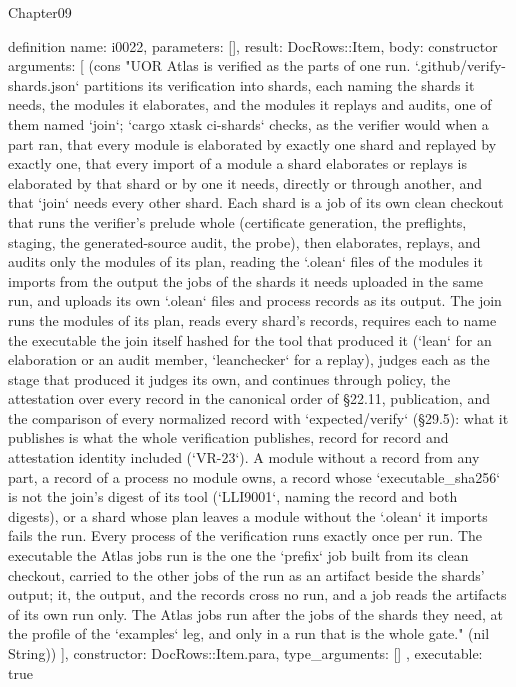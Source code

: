 \begin{lexlean}{Chapter09}
\begin{semanticmodule}
definition{
  name: i0022,
  parameters: [],
  result: DocRows::Item,
  body: constructor{
    arguments: [
      (cons "UOR Atlas is verified as the parts of one run. `.github/verify-shards.json` partitions its verification into shards, each naming the shards it needs, the modules it elaborates, and the modules it replays and audits, one of them named `join`; `cargo xtask ci-shards` checks, as the verifier would when a part ran, that every module is elaborated by exactly one shard and replayed by exactly one, that every import of a module a shard elaborates or replays is elaborated by that shard or by one it needs, directly or through another, and that `join` needs every other shard. Each shard is a job of its own clean checkout that runs the verifier's prelude whole (certificate generation, the preflights, staging, the generated-source audit, the probe), then elaborates, replays, and audits only the modules of its plan, reading the `.olean` files of the modules it imports from the output the jobs of the shards it needs uploaded in the same run, and uploads its own `.olean` files and process records as its output. The join runs the modules of its plan, reads every shard's records, requires each to name the executable the join itself hashed for the tool that produced it (`lean` for an elaboration or an audit member, `leanchecker` for a replay), judges each as the stage that produced it judges its own, and continues through policy, the attestation over every record in the canonical order of §22.11, publication, and the comparison of every normalized record with `expected/verify` (§29.5): what it publishes is what the whole verification publishes, record for record and attestation identity included (`VR-23`). A module without a record from any part, a record of a process no module owns, a record whose `executable_sha256` is not the join's digest of its tool (`LLI9001`, naming the record and both digests), or a shard whose plan leaves a module without the `.olean` it imports fails the run. Every process of the verification runs exactly once per run. The executable the Atlas jobs run is the one the `prefix` job built from its clean checkout, carried to the other jobs of the run as an artifact beside the shards' output; it, the output, and the records cross no run, and a job reads the artifacts of its own run only. The Atlas jobs run after the jobs of the shards they need, at the profile of the `examples` leg, and only in a run that is the whole gate." (nil String))
    ],
    constructor: DocRows::Item.para,
    type_arguments: []
  },
  executable: true
}


\end{semanticmodule}
\end{lexlean}
